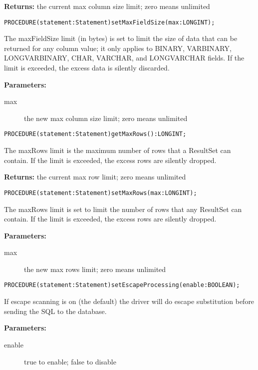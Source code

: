      {\bf Returns: } 
          the current max column size limit; zero means unlimited 


\verb'PROCEDURE(statement:Statement)setMaxFieldSize(max:LONGINT);'

     The maxFieldSize limit (in bytes) is set to limit the size of data that can be returned for any column value; it only applies to BINARY,
     VARBINARY, LONGVARBINARY, CHAR, VARCHAR, and LONGVARCHAR fields. If the limit is exceeded, the excess data is silently
     discarded. 

     {\bf Parameters: } 
\begin{description}
\item[max] the new max column size limit; zero means unlimited 
\end{description}


\verb'PROCEDURE(statement:Statement)getMaxRows():LONGINT;'

     The maxRows limit is the maximum number of rows that a ResultSet can contain. If the limit is exceeded, the excess rows are
     silently dropped. 

     {\bf Returns: } 
          the current max row limit; zero means unlimited 


\verb'PROCEDURE(statement:Statement)setMaxRows(max:LONGINT);'

     The maxRows limit is set to limit the number of rows that any ResultSet can contain. If the limit is exceeded, the excess rows are
     silently dropped. 

     {\bf Parameters: } 
\begin{description}
\item[max] the new max rows limit; zero means unlimited 
\end{description}


\verb'PROCEDURE(statement:Statement)setEscapeProcessing(enable:BOOLEAN);'

     If escape scanning is on (the default) the driver will do escape substitution before sending the SQL to the database. 

     {\bf Parameters: } 
\begin{description}
\item[enable] true to enable; false to disable 
\end{description}

